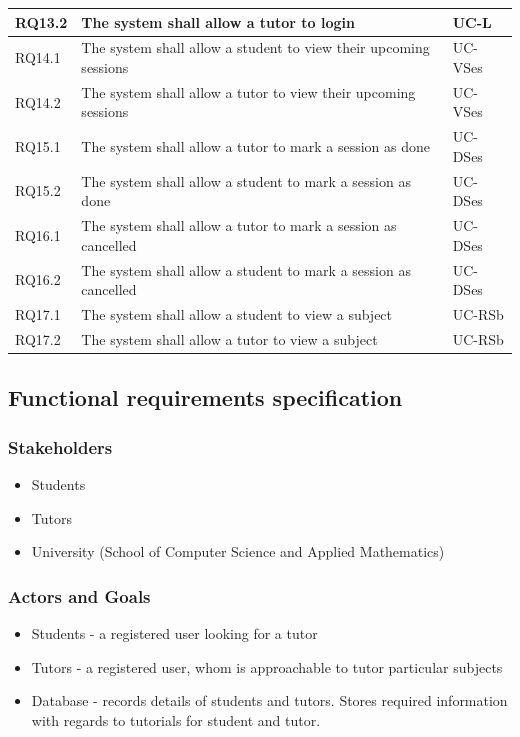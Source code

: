 \documentclass[12pt]{article}
\begin{document}
{\begin{longtable}{| l | p{10cm}| l |}
				RQ13.2 & The system shall allow a tutor to login &UC-L\\ \hline
				RQ14.1 & The system shall allow a student to view their upcoming sessions  &UC-VSes\\ \hline
				RQ14.2 & The system shall allow a tutor to view their upcoming sessions  &UC-VSes\\ \hline
				RQ15.1 & The system shall allow a tutor to mark a session as done &UC-DSes\\ \hline
				RQ15.2 & The system shall allow a student to mark a session as done &UC-DSes\\ \hline
				RQ16.1 & The system shall allow a tutor to mark a session as cancelled &UC-DSes\\ \hline
				RQ16.2 & The system shall allow a student to mark a session as cancelled &UC-DSes\\ \hline
				RQ17.1 & The system shall allow a student to view a subject &UC-RSb\\ \hline
				RQ17.2 & The system shall allow a tutor to view a subject &UC-RSb\\ \hline
\end{longtable}
}
\subsection{Functional requirements specification}
\subsubsection{Stakeholders}
\begin{itemize}
\item Students
\item Tutors
\item University (School of Computer Science and Applied Mathematics)
\end{itemize}
\subsubsection{Actors and Goals}
\begin{itemize}
\item Students - a registered user looking for a tutor
\item Tutors - a registered user, whom is approachable to tutor particular subjects
\item Database - records details of students and tutors. Stores required information with regards to tutorials for student and tutor.
\end{itemize}
\end{document}
